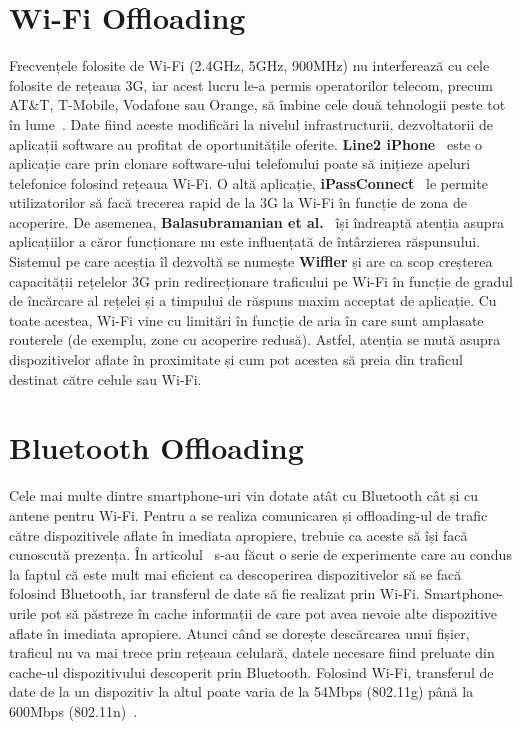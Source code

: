 \documentclass[12pt,a4paper]{report}
\begin{document}
\section{Wi-Fi Offloading}
Frecvențele folosite de Wi-Fi (2.4GHz, 5GHz, 900MHz) nu interferează cu cele folosite de rețeaua 3G, iar acest lucru le-a permis operatorilor telecom, precum AT\&T, T-Mobile, Vodafone sau Orange, să îmbine cele două tehnologii peste tot în lume~\cite{offloading-jou}. Date fiind aceste modificări la nivelul infrastructurii, dezvoltatorii de aplicații software au profitat de oportunitățile oferite. \textbf{Line2 iPhone}~\cite{line2} este o aplicație care prin clonare software-ului telefonului poate să inițieze apeluri telefonice folosind rețeaua Wi-Fi. O altă aplicație, \textbf{iPassConnect}~\cite{ipass} le permite utilizatorilor să facă trecerea rapid de la 3G la Wi-Fi în funcție de zona de acoperire. De asemenea, \textbf{Balasubramanian et al.}~\cite{balasubramanian} își îndreaptă atenția asupra aplicațiilor a căror funcționare nu este influențată de întârzierea răspunsului. Sistemul pe care aceștia îl dezvoltă se numește \textbf{Wiffler} și are ca scop creșterea capacității rețelelor 3G prin redirecționare traficului pe Wi-Fi în funcție de gradul de încărcare al rețelei și a timpului de răspuns maxim acceptat de aplicație.
Cu toate acestea, Wi-Fi vine cu limitări în funcție de aria în care sunt amplasate routerele (de exemplu, zone cu acoperire redusă). Astfel, atenția se mută asupra dispozitivelor aflate în proximitate și cum pot acestea să preia din traficul destinat către celule sau Wi-Fi.

\section{Bluetooth Offloading}
Cele mai multe dintre smartphone-uri vin dotate atât cu Bluetooth cât și cu antene pentru Wi-Fi. Pentru a se realiza comunicarea și offloading-ul de trafic către dispozitivele aflate în imediata apropiere, trebuie ca aceste să își facă cunoscută prezența. În articolul~\cite{offloading-jou} s-au făcut o serie de experimente care au condus la faptul că este mult mai eficient ca descoperirea dispozitivelor să se facă folosind Bluetooth, iar transferul de date să fie realizat prin Wi-Fi. Smartphone-urile pot să păstreze în cache informații de care pot avea nevoie alte dispozitive aflate în imediata apropiere. Atunci când se dorește descărcarea unui fișier, traficul nu va mai trece prin rețeaua celulară, datele necesare fiind preluate din cache-ul dispozitivului descoperit prin Bluetooth. Folosind Wi-Fi, transferul de date de la un dispozitiv la altul poate varia de la 54Mbps (802.11g) până la 600Mbps (802.11n)~\cite{offloading-jou}.
\end{document}

